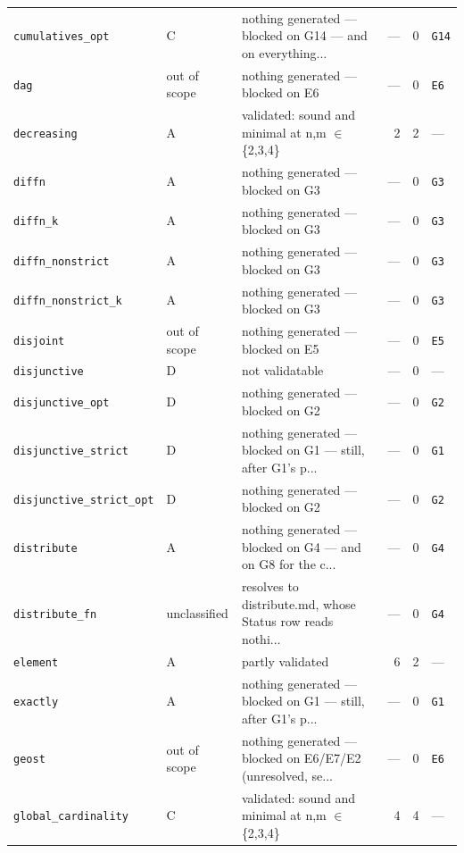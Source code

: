 \documentclass[10pt,a4paper]{article}
\begin{document}
\begin{longtable}{@{}>{\raggedright\arraybackslash}p{}l>{\raggedright\arraybackslash}p{}rrl@{}}
\texttt{cumulatives\_\allowbreak{}opt} & C & nothing generated --- blocked on G14 --- and on everything... & --- & 0 & \texttt{G14} \\
\texttt{dag} & out of scope & nothing generated --- blocked on E6 & --- & 0 & \texttt{E6} \\
\texttt{decreasing} & A & validated: sound and minimal at n,m $\in$ \{2,3,4\} & 2 & 2 & --- \\
\texttt{diffn} & A & nothing generated --- blocked on G3 & --- & 0 & \texttt{G3} \\
\texttt{diffn\_\allowbreak{}k} & A & nothing generated --- blocked on G3 & --- & 0 & \texttt{G3} \\
\texttt{diffn\_\allowbreak{}nonstrict} & A & nothing generated --- blocked on G3 & --- & 0 & \texttt{G3} \\
\texttt{diffn\_\allowbreak{}nonstrict\_\allowbreak{}k} & A & nothing generated --- blocked on G3 & --- & 0 & \texttt{G3} \\
\texttt{disjoint} & out of scope & nothing generated --- blocked on E5 & --- & 0 & \texttt{E5} \\
\texttt{disjunctive} & D & not validatable & --- & 0 & --- \\
\texttt{disjunctive\_\allowbreak{}opt} & D & nothing generated --- blocked on G2 & --- & 0 & \texttt{G2} \\
\texttt{disjunctive\_\allowbreak{}strict} & D & nothing generated --- blocked on G1 --- still, after G1's p... & --- & 0 & \texttt{G1} \\
\texttt{disjunctive\_\allowbreak{}strict\_\allowbreak{}opt} & D & nothing generated --- blocked on G2 & --- & 0 & \texttt{G2} \\
\texttt{distribute} & A & nothing generated --- blocked on G4 --- and on G8 for the c... & --- & 0 & \texttt{G4} \\
\texttt{distribute\_\allowbreak{}fn} & unclassified & resolves to distribute.md, whose Status row reads nothi... & --- & 0 & \texttt{G4} \\
\texttt{element} & A & partly validated & 6 & 2 & --- \\
\texttt{exactly} & A & nothing generated --- blocked on G1 --- still, after G1's p... & --- & 0 & \texttt{G1} \\
\texttt{geost} & out of scope & nothing generated --- blocked on E6/E7/E2 (unresolved, se... & --- & 0 & \texttt{E6} \\
\texttt{global\_\allowbreak{}cardinality} & C & validated: sound and minimal at n,m $\in$ \{2,3,4\} & 4 & 4 & --- \\

\end{longtable}
\end{document}
